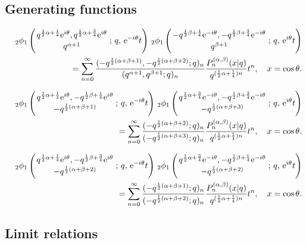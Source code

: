 \documentclass[envcountchap,graybox]{svmono}
\newcommand{\qhyp}[5]{\mbox{}_{#1}{\phi}_{#2}
\left(\genfrac{}{}{0pt}{}{#3}{#4}\,;\,q,\,#5\right)}
\newcommand{\e}{\textrm{e}}
\begin{document}
\subsection*{Generating functions}
\begin{eqnarray}
\label{GenContqJacobi1}
& &\qhyp{2}{1}{q^{\frac{1}{2}\alpha+\frac{1}{4}}\e^{i\theta},
q^{\frac{1}{2}\alpha+\frac{3}{4}}\e^{i\theta}}{q^{\alpha+1}}{\e^{-i\theta}t}\,
\qhyp{2}{1}{-q^{\frac{1}{2}\beta+\frac{1}{4}}\e^{-i\theta},
-q^{\frac{1}{2}\beta+\frac{3}{4}}\e^{-i\theta}}{q^{\beta+1}}{\e^{i\theta}t}\nonumber\\
& &{}=\sum_{n=0}^{\infty}\frac{(-q^{\frac{1}{2}(\alpha+\beta+1)},-q^{\frac{1}{2}(\alpha+\beta+2)};q)_n}
{(q^{\alpha+1},q^{\beta+1};q)_n}\frac{P_n^{(\alpha,\beta)}(x|q)}{q^{(\frac{1}{2}\alpha+\frac{1}{4})n}}t^n,
\quad x=\cos\theta.
\end{eqnarray}

\begin{eqnarray}
\label{GenContqJacobi2}
& &\qhyp{2}{1}{q^{\frac{1}{2}\alpha+\frac{1}{4}}\e^{i\theta},
-q^{\frac{1}{2}\beta+\frac{1}{4}}\e^{i\theta}}{-q^{\frac{1}{2}(\alpha+\beta+1)}}{\e^{-i\theta}t}\,
\qhyp{2}{1}{q^{\frac{1}{2}\alpha+\frac{3}{4}}\e^{-i\theta},
-q^{\frac{1}{2}\beta+\frac{3}{4}}\e^{-i\theta}}{-q^{\frac{1}{2}(\alpha+\beta+3)}}{\e^{i\theta}t}\nonumber\\
& &{}=\sum_{n=0}^{\infty}\frac{(-q^{\frac{1}{2}(\alpha+\beta+2)};q)_n}
{(-q^{\frac{1}{2}(\alpha+\beta+3)};q)_n}\frac{P_n^{(\alpha,\beta)}(x|q)}{q^{(\frac{1}{2}\alpha+\frac{1}{4})n}}t^n,
\quad x=\cos\theta.
\end{eqnarray}

\begin{eqnarray}
\label{GenContqJacobi3}
& &\qhyp{2}{1}{q^{\frac{1}{2}\alpha+\frac{1}{4}}\e^{i\theta},
-q^{\frac{1}{2}\beta+\frac{3}{4}}\e^{i\theta}}{-q^{\frac{1}{2}(\alpha+\beta+2)}}{\e^{-i\theta}t}\,
\qhyp{2}{1}{q^{\frac{1}{2}\alpha+\frac{3}{4}}\e^{-i\theta},
-q^{\frac{1}{2}\beta+\frac{1}{4}}\e^{-i\theta}}{-q^{\frac{1}{2}(\alpha+\beta+2)}}{\e^{i\theta}t}\nonumber\\
& &{}=\sum_{n=0}^{\infty}\frac{(-q^{\frac{1}{2}(\alpha+\beta+1)};q)_n}
{(-q^{\frac{1}{2}(\alpha+\beta+2)};q)_n}\frac{P_n^{(\alpha,\beta)}(x|q)}{q^{(\frac{1}{2}\alpha+\frac{1}{4})n}}t^n,
\quad x=\cos\theta.
\end{eqnarray}

\subsection*{Limit relations}
\end{document}
